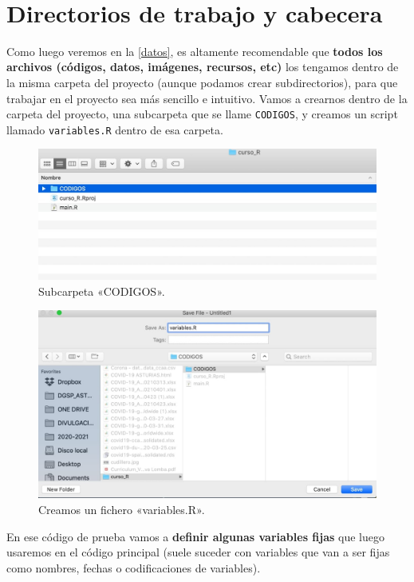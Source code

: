 \documentclass[11pt,]{book}
\begin{document}
~

\hypertarget{directorios-de-trabajo-y-cabecera}{%
\section{Directorios de trabajo y cabecera}\label{directorios-de-trabajo-y-cabecera}}

Como luego veremos en la \ref{datos}, es altamente recomendable que \textbf{todos los archivos (códigos, datos, imágenes, recursos, etc)} los tengamos dentro de la misma carpeta del proyecto (aunque podamos crear subdirectorios), para que trabajar en el proyecto sea más sencillo e intuitivo. Vamos a crearnos dentro de la carpeta del proyecto, una subcarpeta que se llame \texttt{CODIGOS}, y creamos un script llamado \texttt{variables.R} dentro de esa carpeta.

\begin{figure}

{\centering \includegraphics[width=0.5\linewidth]{./img/carpeta_codigos} 

}

\caption{Subcarpeta «CODIGOS».}\label{fig:carpeta-codigos}
\end{figure}

\begin{figure}

{\centering \includegraphics[width=0.5\linewidth]{./img/carpeta_codigos1} 

}

\caption{Creamos un fichero «variables.R».}\label{fig:carpeta-codigos1}
\end{figure}

En ese código de prueba vamos a \textbf{definir algunas variables fijas} que luego usaremos en el código principal (suele suceder con variables que van a ser fijas como nombres, fechas o codificaciones de variables).
\end{document}
